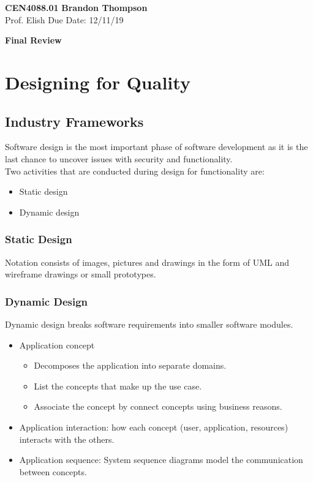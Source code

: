 \documentclass[12pt]{article}
\begin{document}
\noindent
\textbf{CEN4088.01} \hfill \textbf{Brandon Thompson} \\
\normalsize Prof. Elish \hfill Due Date: 12/11/19 \\

\begin{center}
\textbf{Final Review}
\end{center}


\section{Designing for Quality}
\subsection{Industry Frameworks}
Software design is the most important phase of software development as it is the last chance
to uncover issues with security and functionality.\\
Two activities that are conducted during design for functionality are:
\begin{itemize}
	\item Static design
	\item Dynamic design
\end{itemize}
\subsubsection{Static Design}
Notation consists of images, pictures and drawings in the form of UML and wireframe drawings
or small prototypes.
\subsubsection{Dynamic Design}
Dynamic design breaks software requirements into smaller software modules.
\begin{itemize}
	\item Application concept
		\begin{itemize}
			\item Decomposes the application into separate domains.
			\item List the concepts that make up the use case.
			\item Associate the concept by connect concepts using business reasons.
		\end{itemize}
	\item Application interaction: how each concept (user, application, resources)
		interacts with the others.
	\item Application sequence: System sequence diagrams model the communication between concepts.
\end{itemize}
\end{document}
